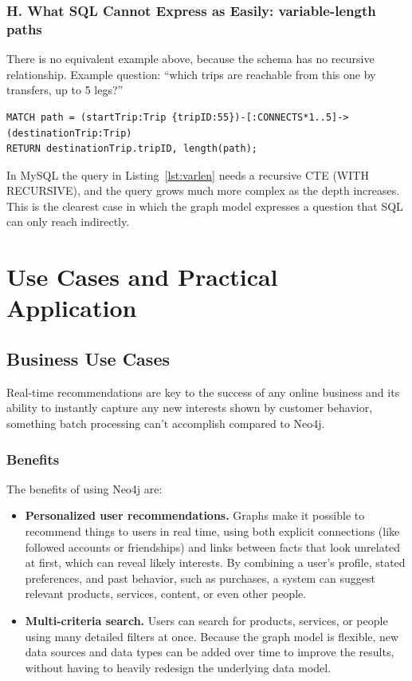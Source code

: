 \documentclass[11pt,a4paper]{article}
\begin{document}
\subsubsection*{H. What SQL Cannot Express as Easily: variable-length paths}

There is no equivalent example above, because the schema has no recursive relationship. Example question: ``which trips are reachable from this one by transfers, up to 5 legs?''

\begin{lstlisting}[style=cyphercode,caption={A variable-length path in Cypher, which SQL expresses with a recursive CTE},label={lst:varlen}]
MATCH path = (startTrip:Trip {tripID:55})-[:CONNECTS*1..5]->(destinationTrip:Trip)
RETURN destinationTrip.tripID, length(path);
\end{lstlisting}

In MySQL the query in Listing~\ref{lst:varlen} needs a recursive CTE (WITH RECURSIVE), and the query grows much more complex as the depth increases. This is the clearest case in which the graph model expresses a question that SQL can only reach indirectly.

\section{Use Cases and Practical Application}

\subsection{Business Use Cases}

Real-time recommendations are key to the success of any online business and its ability to instantly capture any new interests shown by customer behavior, something batch processing can't accomplish compared to Neo4j.

\subsubsection*{Benefits}

The benefits of using Neo4j are:

\begin{itemize}
  \item \textbf{Personalized user recommendations.} Graphs make it possible to recommend things to users in real time, using both explicit connections (like followed accounts or friendships) and links between facts that look unrelated at first, which can reveal likely interests. By combining a user's profile, stated preferences, and past behavior, such as purchases, a system can suggest relevant products, services, content, or even other people.
  \item \textbf{Multi-criteria search.} Users can search for products, services, or people using many detailed filters at once. Because the graph model is flexible, new data sources and data types can be added over time to improve the results, without having to heavily redesign the underlying data model.
\end{itemize}
\end{document}
